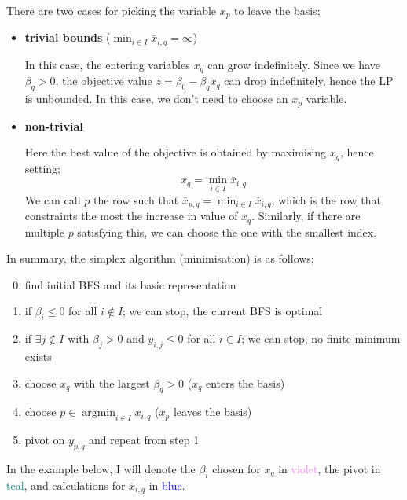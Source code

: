 \documentclass[a4paper, 12pt]{article}
\DeclareMathOperator*{\argmin}{argmin}
\newcommand{\violet}[1]{\textcolor{violet}{#1}}
\newcommand{\blue}[1]{\textcolor{blue}{#1}}
\newcommand{\teal}[1]{\textcolor{teal}{#1}}
\begin{document}
                There are two cases for picking the variable $x_p$ to leave the basis;
                \begin{itemize}
                    \itemsep0em
                    \item \textbf{trivial bounds} ($\min_{i \in I} \bar{x}_{i, q} = \infty$)
                        \smallskip

                        In this case, the entering variables $x_q$ can grow indefinitely.
                        Since we have $\beta_q > 0$, the objective value $z = \beta_0 - \beta_q x_q$ can drop indefinitely, hence the LP is unbounded.
                        In this case, we don't need to choose an $x_p$ variable.
                    \item \textbf{non-trivial}
                        \smallskip

                        Here the best value of the objective is obtained by maximising $x_q$, hence setting;
                        $$x_q = \min_{i \in I} \bar{x}_{i, q}$$
                        We can call $p$ the row such that $\bar{x}_{p, q} = \min_{i \in I} \bar{x}_{i, q}$, which is the row that constraints the most the increase in value of $x_q$.
                        Similarly, if there are multiple $p$ satisfying this, we can choose the one with the smallest index.
                \end{itemize}
                In summary, the simplex algorithm (minimisation) is as follows;
                \begin{enumerate}[1.]
                    \setcounter{enumi}{-1}
                    \itemsep0em
                    \item find initial BFS and its basic representation
                    \item if $\beta_i \leq 0$ for all $i \notin I$; we can stop, the current BFS is optimal
                    \item if $\exists j \notin I$ with $\beta_j > 0$ and $y_{i, j} \leq 0$ for all $i \in I$; we can stop, no finite minimum exists
                    \item choose $x_q$ with the largest $\beta_q > 0$ ($x_q$ enters the basis)
                    \item choose $p \in \argmin_{i \in I} \bar{x}_{i, q}$ ($x_p$ leaves the basis)
                    \item pivot on $y_{p, q}$ and repeat from step 1
                \end{enumerate}
                In the example below, I will denote the $\beta_i$ chosen for $x_q$ in \violet{violet}, the pivot in \teal{teal}, and calculations for $\bar{x}_{i, q}$ in \blue{blue}.
\end{document}
